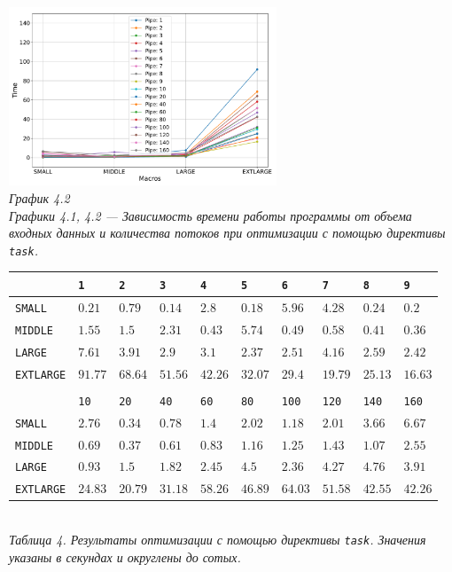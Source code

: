 \documentclass[a4paper, 11pt]{article}
\begin{document}
\begin{center}
    \includegraphics[width=0.6\textwidth]{../graph/task1.pdf} \\
    \small \it
    График 4.2\\ Графики 4.1, 4.2 --- Зависимость времени работы программы от объема входных данных и количества потоков при оптимизации с помощью директивы \texttt{task}.
\end{center}

\begin{center}
    \begin{tabular}{l | l l l l l l l l l}
        & \texttt{1} & \texttt{2} & \texttt{3} & \texttt{4} & \texttt{5} & \texttt{6} & \texttt{7} & \texttt{8} & \texttt{9} \\
        \hline
        \texttt{SMALL}    & $0.21$ & $0.79$ & $0.14$ & $2.8$ & $0.18$ & $5.96$ & $4.28$ & $0.24$ & $0.2$ \\
        \texttt{MIDDLE}   & $1.55$ & $1.5$ & $2.31$ & $0.43$ & $5.74$ & $0.49$ & $0.58$ & $0.41$ & $0.36$ \\
        \texttt{LARGE}    & $7.61$ & $3.91$ & $2.9$ & $3.1$ & $2.37$ & $2.51$ & $4.16$ & $2.59$ & $2.42$ \\
        \texttt{EXTLARGE} & $91.77$ & $68.64$ & $51.56$ & $42.26$ & $32.07$ & $29.4$ & $19.79$ & $25.13$ & $16.63$ \\
        \vspace{0.4cm}\\
        & \texttt{10} & \texttt{20} & \texttt{40} & \texttt{60} & \texttt{80} & \texttt{100} & \texttt{120} & \texttt{140} & \texttt{160} \\
        \hline
        \texttt{SMALL}    & $2.76$ & $0.34$ & $0.78$ & $1.4$ & $2.02$ & $1.18$ & $2.01$ & $3.66$ & $6.67$ \\
        \texttt{MIDDLE}   & $0.69$ & $0.37$ & $0.61$ & $0.83$ & $1.16$ & $1.25$ & $1.43$ & $1.07$ & $2.55$ \\
        \texttt{LARGE}    & $0.93$ & $1.5$ & $1.82$ & $2.45$ & $4.5$ & $2.36$ & $4.27$ & $4.76$ & $3.91$ \\
        \texttt{EXTLARGE} & $24.83$ & $20.79$ & $31.18$ & $58.26$ & $46.89$ & $64.03$ & $51.58$ & $42.55$ & $42.26$ \\
    \end{tabular}\\
    \vspace{0.3cm}
    \small \it
    Таблица 4. Результаты оптимизации с помощью директивы \texttt{task}. Значения указаны в секундах и округлены до сотых.  
\end{center}
\newpage
\end{document}
